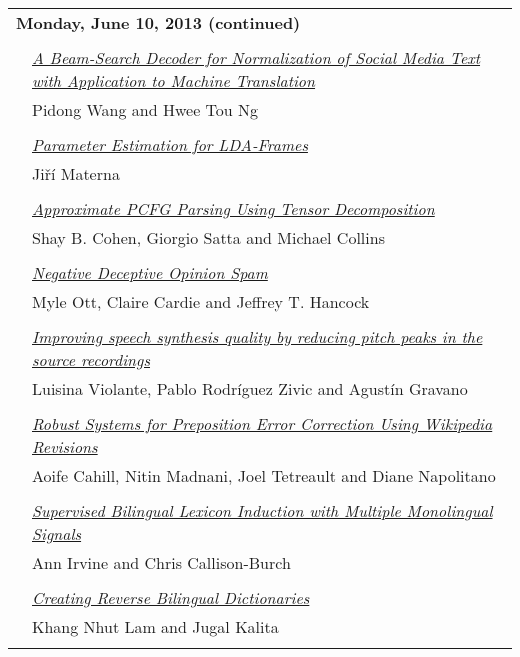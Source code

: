 \begin{tabular}{p{20mm}p{138mm}}
\\
\multicolumn{2}{l}{\bf Monday, June 10, 2013
 (continued)} \\\\
 & \hyperlink{page.471}{\em A Beam-Search Decoder for Normalization of Social Media Text with Application to Machine Translation}\\
         & Pidong Wang and Hwee Tou Ng \\
\\

 & \hyperlink{page.482}{\em Parameter Estimation for LDA-Frames}\\
         & Ji\v{r}\'{i} Materna \\
\\

 & \hyperlink{page.487}{\em Approximate PCFG Parsing Using Tensor Decomposition}\\
         & Shay B. Cohen, Giorgio Satta and Michael Collins \\
\\

 & \hyperlink{page.497}{\em Negative Deceptive Opinion Spam}\\
         & Myle Ott, Claire Cardie and Jeffrey T. Hancock \\
\\

 & \hyperlink{page.502}{\em Improving speech synthesis quality by reducing pitch peaks in the source recordings}\\
         & Luisina Violante, Pablo Rodr\'{i}guez Zivic and Agust\'{i}n Gravano \\
\\

 & \hyperlink{page.507}{\em Robust Systems for Preposition Error Correction Using Wikipedia Revisions}\\
         & Aoife Cahill, Nitin Madnani, Joel Tetreault and Diane Napolitano \\
\\

 & \hyperlink{page.518}{\em Supervised Bilingual Lexicon Induction with Multiple Monolingual Signals}\\
         & Ann Irvine and Chris Callison-Burch \\
\\

 & \hyperlink{page.524}{\em Creating Reverse Bilingual Dictionaries}\\
         & Khang Nhut Lam and Jugal Kalita \\
\\


\end{tabular}
